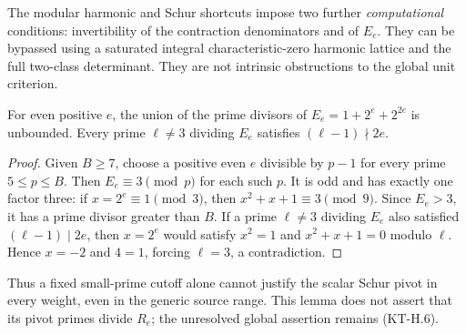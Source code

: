 The modular harmonic and Schur shortcuts impose two further
\emph{computational} conditions: invertibility of the contraction
denominators and of $E_e$.  They can be bypassed using a saturated
integral characteristic-zero harmonic lattice and the full
two-class determinant.  They are not intrinsic obstructions
to the global unit criterion.

\begin{lemma}
For even positive $e$, the union of the prime divisors of
$E_e=1+2^e+2^{2e}$ is unbounded.  Every prime $\ell\ne3$
dividing $E_e$ satisfies $(\ell-1)\nmid2e$.
\end{lemma}
\begin{proof}
Given $B\ge7$, choose a positive even $e$ divisible by $p-1$
for every prime $5\le p\le B$.  Then $E_e\equiv3\pmod p$
for each such $p$.  It is odd and has exactly one factor three:
if $x=2^e\equiv1\pmod3$, then $x^2+x+1\equiv3\pmod9$.
Since $E_e>3$, it has a prime divisor greater than $B$.
If a prime $\ell\ne3$ dividing $E_e$ also satisfied
$(\ell-1)\mid2e$, then $x=2^e$ would satisfy $x^2=1$ and
$x^2+x+1=0$ modulo $\ell$.  Hence $x=-2$ and $4=1$,
forcing $\ell=3$, a contradiction.
\end{proof}

Thus a fixed small-prime cutoff alone cannot justify the scalar
Schur pivot in every weight, even in the generic source range.
This lemma does not assert that its pivot primes divide $R_e$;
the unresolved global assertion remains (KT-H.6).
